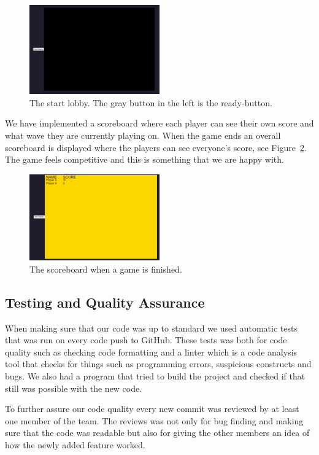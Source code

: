 \documentclass[a4paper]{article}
\begin{document}
\begin{figure}
    \centering
    \includegraphics[width=0.5\textwidth]{pics/lobby1.png}
    \caption{The start lobby. The gray button in the left is the ready-button.}
    \label{fig:lobby}
\end{figure}

We have implemented a scoreboard where each player can see their own score and what wave they are currently playing on. When the game ends an overall scoreboard is displayed where the players can see everyone's score, see Figure~\ref{fig:scoreboard}. The game feels competitive and this is something that we are happy with.

\begin{figure}
    \centering
    \includegraphics[width=0.5\textwidth]{pics/score1.png}
    \caption{The scoreboard when a game is finished.}
    \label{fig:scoreboard}
\end{figure}

\subsection{Testing and Quality Assurance}
When making sure that our code was up to standard we used automatic tests that was run on every code push to GitHub. These tests was both for code quality such as checking code formatting and a linter which is a code analysis tool that checks for things such as programming errors, suspicious constructs and bugs. We also had a program that tried to build the project and checked if that still was possible with the new code.

To further assure our code quality every new commit was reviewed by at least one member of the team. The reviews was not only for bug finding and making sure that the code was readable but also for giving the other members an idea of how the newly added feature worked.
\end{document}

